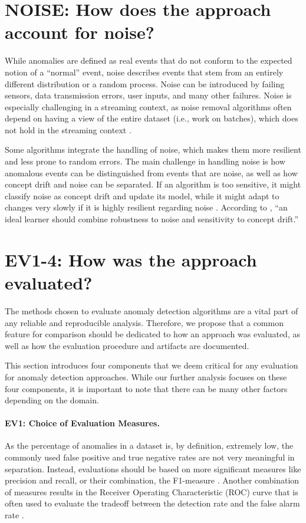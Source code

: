 \section{NOISE: How does the approach account for noise?}
While anomalies are defined as real events that do not conform to the expected notion of a ``normal'' event, noise describes events that stem from an entirely different distribution or a random process. Noise can be introduced by failing sensors, data transmission errors, user inputs, and many other failures. Noise is especially challenging in a streaming context, as noise removal algorithms often depend on having a view of the entire dataset (i.e., work on batches), which does not hold in the streaming context \citep{agrawal_adaptive_2017}.

Some algorithms integrate the handling of noise, which makes them more resilient and less prone to random errors. The main challenge in handling noise is how anomalous events can be distinguished from events that are noise, as well as how concept drift and noise can be separated. If an algorithm is too sensitive, it might classify noise as concept drift and update its model, while it might adapt to changes very slowly if it is highly resilient regarding noise \citep{tsymbal_problem_2004}. According to \citet{widmer_gerhard_learning_1996, tsymbal_problem_2004}, ``an ideal learner should combine robustness to noise and sensitivity to concept drift.''


\section{EV1-4: How was the approach evaluated?}
The methods chosen to evaluate anomaly detection algorithms are a vital part of any reliable and reproducible analysis. Therefore, we propose that a common feature for comparison should be dedicated to how an approach was evaluated, as well as how the evaluation procedure and artifacts are documented.

This section introduces four components that we deem critical for any evaluation for anomaly detection approaches. While our further analysis focuses on these four components, it is important to note that there can be many other factors depending on the domain.

\paragraph{EV1: Choice of Evaluation Measures.}
As the percentage of anomalies in a dataset is, by definition, extremely low, the commonly used false positive and true negative rates are not very meaningful in separation. Instead, evaluations should be based on more significant measures like precision and recall, or their combination, the F1-measure \citep{dos_santos_teixeira_data_2010}. Another combination of measures results in the Receiver Operating Characteristic (ROC) curve that is often used to evaluate the tradeoff between the detection rate and the false alarm rate \citep{pimentel_review_2014}.

